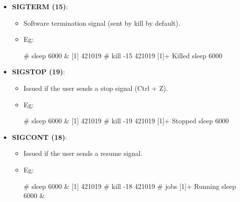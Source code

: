 \begin{flushleft}
\begin{itemize}
\begin{itemize}
\begin{itemize}
			\item \textbf{SIGTERM (15)}: 
			\begin{itemize}
				\item Software termination signal (sent by kill by default).
				\item Eg:
				\begin{tcolorbox}[breakable,notitle,boxrule=-0pt,colback=black,colframe=black]
					\color{green}
					\font=9pt
					\# sleep 6000 \&
					\newline
					\color{white}
					[1] 421019
					\newline
					\newline
					\color{green}						
					\# kill -15 421019
					\newline
					\color{white}
					[1]+  Killed                  sleep 6000
					\font=4pt
				\end{tcolorbox}
			\end{itemize}
			\newpage
			\item \textbf{SIGSTOP (19)}: 
			\begin{itemize}
				\item Issued if the user sends a stop signal (Ctrl + Z).
				\item Eg:
				\begin{tcolorbox}[breakable,notitle,boxrule=-0pt,colback=black,colframe=black]
					\color{green}
					\fontdimen2\font=9pt
					\# sleep 6000 \&
					\newline
					\color{white}
					[1] 421019
					\newline
					\newline
					\color{green}						
					\# kill -19 421019
					\newline
					\color{white}
					[1]+  Stopped                 sleep 6000
					\fontdimen2\font=4pt
				\end{tcolorbox}
			\end{itemize}

			\item \textbf{SIGCONT (18)}: 
			\begin{itemize}
				\item Issued if the user sends a resume signal.
				\item Eg:
				\begin{tcolorbox}[breakable,notitle,boxrule=-0pt,colback=black,colframe=black]
					\color{green}
					\font=9pt
					\# sleep 6000 \&
					\newline
					\color{white}
					[1] 421019
					\newline
					\newline
					\color{green}						
					\# kill -18 421019
					\newline
					\# jobs
					\newline
					\color{white}
					[1]+  Running                 sleep 6000 \&
					\font=4pt
				\end{tcolorbox}
			\end{itemize}


\end{itemize}
\end{itemize}
\end{itemize}
\end{flushleft}
